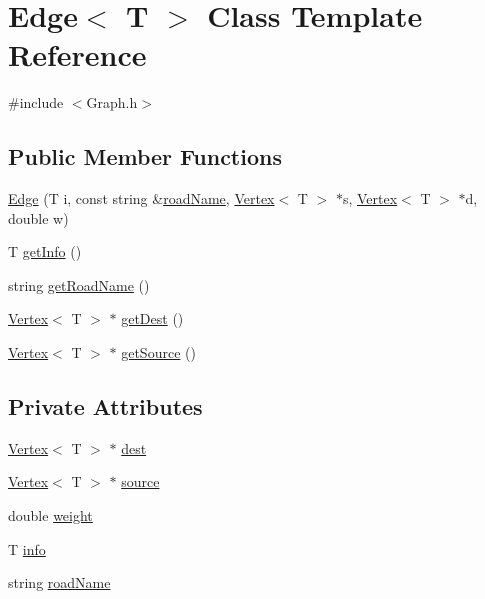 \hypertarget{classEdge}{}\section{Edge$<$ T $>$ Class Template Reference}
\label{classEdge}


{\ttfamily \#include $<$Graph.\+h$>$}

\subsection*{Public Member Functions}
\begin{DoxyCompactItemize}
\item 
\hyperlink{classEdge_a820d09b63370364928eb5f42507b4a58}{Edge} (T i, const string \&\hyperlink{classEdge_afaa271c93b0b5ac10547d196e3a6fad7}{road\+Name}, \hyperlink{classVertex}{Vertex}$<$ T $>$ $\ast$s, \hyperlink{classVertex}{Vertex}$<$ T $>$ $\ast$d, double w)
\item 
T \hyperlink{classEdge_a9cfd65d4ac2da66e35350e6ad7ab531e}{get\+Info} ()
\item 
string \hyperlink{classEdge_ae0244f82a28d938a6d620c69a157298a}{get\+Road\+Name} ()
\item 
\hyperlink{classVertex}{Vertex}$<$ T $>$ $\ast$ \hyperlink{classEdge_a75baa54b9c32895fbe813858ab8f27e2}{get\+Dest} ()
\item 
\hyperlink{classVertex}{Vertex}$<$ T $>$ $\ast$ \hyperlink{classEdge_a587df1a5480061d44796009d577e2191}{get\+Source} ()
\end{DoxyCompactItemize}
\subsection*{Private Attributes}
\begin{DoxyCompactItemize}
\item 
\hyperlink{classVertex}{Vertex}$<$ T $>$ $\ast$ \hyperlink{classEdge_ae4d65678b91bd9d814af4720ad87cd0c}{dest}
\item 
\hyperlink{classVertex}{Vertex}$<$ T $>$ $\ast$ \hyperlink{classEdge_aa6d3ef629128f4088d7520924ff4db9a}{source}
\item 
double \hyperlink{classEdge_af188b57b604f0d65e2da48733bd76426}{weight}
\item 
T \hyperlink{classEdge_a3c76337d535f346456b825b3cbc88b14}{info}
\item 
string \hyperlink{classEdge_afaa271c93b0b5ac10547d196e3a6fad7}{road\+Name}
\end{DoxyCompactItemize}

